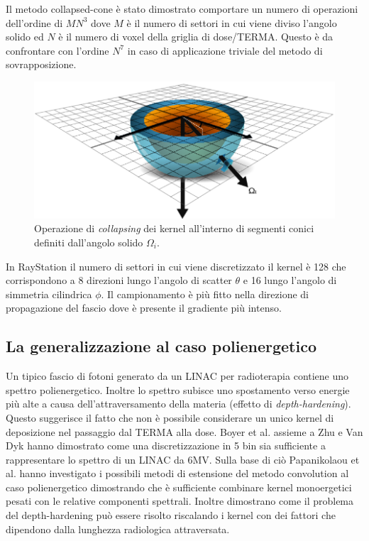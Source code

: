 {Il metodo collapsed-cone è stato dimostrato \cite{Ahnesjo1999} comportare un numero di operazioni dell'ordine di $MN^3$ dove $M$ è il numero di settori in cui viene diviso l'angolo solido ed $N$ è il numero di voxel della griglia di dose/TERMA. Questo è da confrontare con l'ordine $N^7$ in caso di applicazione triviale del metodo di sovrapposizione.

\begin{figure}
\centering
\includegraphics[width=\textwidth]{./cap1/kern_collaps.png}
\caption{Operazione di \textit{collapsing} dei kernel all'interno di segmenti conici definiti dall'angolo solido $\Omega_i$.}
\label{fig:kern_collaps}
\end{figure}

In RayStation il numero di settori in cui viene discretizzato il kernel è 128 che corrispondono a 8 direzioni lungo l'angolo di scatter $\theta$ e 16 lungo l'angolo di simmetria cilindrica $\phi$. Il campionamento è più fitto nella direzione di propagazione del fascio dove è presente il gradiente più intenso.

\subsection{La generalizzazione al caso polienergetico}
Un tipico fascio di fotoni generato da un LINAC per radioterapia contiene uno spettro polienergetico. Inoltre lo spettro subisce uno spostamento verso energie più alte a causa dell'attraversamento della materia (effetto di \textit{depth-hardening}). Questo suggerisce il fatto che non è possibile considerare un unico kernel di deposizione nel passaggio dal TERMA alla dose. Boyer et al. assieme a Zhu e Van Dyk \cite{Boyer1989,Zhu1995} hanno dimostrato come una discretizzazione in 5 bin sia sufficiente a rappresentare lo spettro di un LINAC da 6MV. Sulla base di ciò Papanikolaou et al. \cite{Papanikolaou1993} hanno investigato i possibili metodi di estensione del metodo convolution al caso polienergetico dimostrando che è sufficiente combinare kernel monoergetici pesati con le relative componenti spettrali. Inoltre dimostrano come il problema del depth-hardening può essere risolto riscalando i kernel con dei fattori che dipendono dalla lunghezza radiologica attraversata.

}
